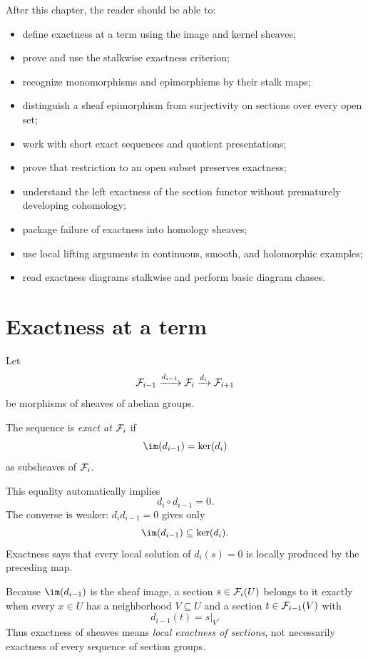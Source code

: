 After this chapter, the reader should be able to:
\begin{itemize}
\item define exactness at a term using the image and kernel sheaves;
\item prove and use the stalkwise exactness criterion;
\item recognize monomorphisms and epimorphisms by their stalk maps;
\item distinguish a sheaf epimorphism from surjectivity on sections over every open set;
\item work with short exact sequences and quotient presentations;
\item prove that restriction to an open subset preserves exactness;
\item understand the left exactness of the section functor without prematurely developing
cohomology;
\item package failure of exactness into homology sheaves;
\item use local lifting arguments in continuous, smooth, and holomorphic examples;
\item read exactness diagrams stalkwise and perform basic diagram chases.
\end{itemize}

\section{Exactness at a term}

Let
\[
\mathcal F_{i-1}\xrightarrow{d_{i-1}}\mathcal F_i\xrightarrow{d_i}\mathcal F_{i+1}
\]
be morphisms of sheaves of abelian groups.

\begin{definition}
The sequence is \emph{exact at $\mathcal F_i$} if
\[
\im(d_{i-1})=\ker(d_i)
\]
as subsheaves of $\mathcal F_i$.
\end{definition}

This equality automatically implies
\[
d_i\circ d_{i-1}=0.
\]
The converse is weaker: $d_i d_{i-1}=0$ gives only
\[
\im(d_{i-1})\subseteq\ker(d_i).
\]
Exactness says that every local solution of $d_i(s)=0$ is locally produced by the preceding
map.



\begin{remark}
Because $\im(d_{i-1})$ is the sheaf image, a section $s\in\mathcal F_i(U)$ belongs to it exactly when
every $x\in U$ has a neighborhood $V\subseteq U$ and a section
$t\in\mathcal F_{i-1}(V)$ with
\[
d_{i-1}(t)=s|_V.
\]
Thus exactness of sheaves means \emph{local exactness of sections}, not necessarily exactness
of every sequence of section groups.
\end{remark}

